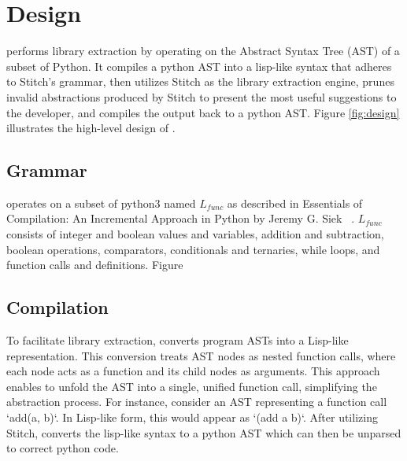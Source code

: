 
\section{Design}


\toolname performs library extraction by operating on the Abstract Syntax Tree (AST) of a subset of Python. It compiles a python AST into a lisp-like syntax that adheres to Stitch's grammar, then utilizes Stitch \cite{Bowers_2023stitch} as the library extraction engine, \toolname prunes invalid abstractions produced by Stitch to present the most useful suggestions to the developer, and compiles the output back to a python AST. Figure \ref{fig:design} illustrates the high-level design of \toolname.

\subsection{Grammar}

\toolname operates on a subset of python3 named $L_{func}$ as described in Essentials of Compilation: An Incremental Approach in Python by Jeremy G. Siek ~\cite{pythonbook}. $L_{func}$ consists of integer and boolean values and variables, addition and subtraction, boolean operations, comparators, conditionals and ternaries, while loops, and function calls and definitions. Figure 



\subsection{Compilation}
To facilitate library extraction, \toolname converts program ASTs into a Lisp-like representation. This conversion treats AST nodes as nested function calls, where each node acts as a function and its child nodes as arguments. This approach enables \toolname to unfold the AST into a single, unified function call, simplifying the abstraction process. For instance, consider an AST representing a function call `add(a, b)`. In Lisp-like form, this would appear as `(add a b)`. After utilizing Stitch, \toolname converts the lisp-like syntax to a python AST which can then be unparsed to correct python code. 


